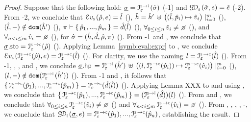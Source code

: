\begin{proof}
Suppose that the following hold: 
$\istate = \interpret{\symbinst}{\senv}(\sstate)$ (\hyp{1}) and $\absgetdomainfun{\symbolic}(\sstate, \jsilexpr) = \sexpr$ (\hyp{2}). 
From \hyp{2}, we conclude that 
$\evalexpr{\symbolic}(\sstore, \jsilexpr) = \sloc$ (), 
$\hat{h} = \hat{h}' \, \uplus \, \big((\hat{l}, \hat{p}_i) \mapsto \hat{v}_i \big)\mid_{i = 0}^m$ (), 
$(\hat{l},-) \notin \texttt{dom} (\hat{h}')$ (), 
$\pi \vdash \{ \, \hat{p}_1, ..., \hat{p}_m \, \} = \hat{d}(\hat{l})$ (), 
$\forall_{0 \leq i \leq n} \, \sexprv_i \neq \none$ (), 
and $\forall_{n < i \leq m} \, \sexprv_i = \none$ (), for $\hat{\sigma} = (\hat{h}, \hat{d}, \hat\rho, \pi)$ (). 
From \hyp{1} and , we conclude that $\istate.\stosel = \interpret{\symbconc}{\senv}(\sstore)$ (). 
 Applying Lemma~\ref{symb:eval:expr} to , we conclude 
 $\evalexpr{\symbolic}(\interpret{\symbconc}{\senv}(\sstore), \jsilexpr) = \interpret{\symbconc}{\senv}(\sloc)$ (). 
 For clarity, we use the naming $\loc = \interpret{\symbconc}{\senv}(\sloc)$ (). 
 From \hyp{1}, , , and , we conclude 
 $\istate.\hpsel =  \interpret{\symbinst}{\senv}(\sheap') \, \uplus \, \big((\loc, \interpret{\symbconc}{\senv}(\sexprp_i)) \mapsto \interpret{\symbconc}{\senv}(\sexprv_i) \big)\mid_{i = 0}^m$ (), 
$(\loc,-) \notin \domain (\interpret{\symbinst}{\senv}(\sheap'))$ ().
From \hyp{1} and , it follows that $\jsilset{\interpret{\symbconc}{\senv}(\sexprp_1), ..., \interpret{\symbconc}{\senv}(\sexprp_m)} = \interpret{\symbconc}{\senv}(\sdom(\sloc))$ ().
Applying Lemma XXX to  and using , we conclude that 
 $\jsilset{\interpret{\symbconc}{\senv}(\sexprp_1), ..., \interpret{\symbconc}{\senv}(\sexprp_m)} = (\interpret{\symbinst}{\senv}(\sdom))(\loc)$ (). 
 From  and , we conclude that 
 {\small $\forall_{0 \leq i \leq n} \, \interpret{\symbconc}{\senv}(\sexprv_i) \neq \none$} () and  
{\small $\forall_{n < i \leq m} \, \interpret{\symbconc}{\senv}(\sexprv_i) = \none$} ().
From , , , , -, we conclude that 
$\absgetdomainfun{\instrumented}(\istate, \jsilexpr) = \interpret{\symbconc}{\senv}(\sexprp_1), ..., \interpret{\symbconc}{\senv}(\sexprp_n)$, 
establishing the result. 
\end{proof}

